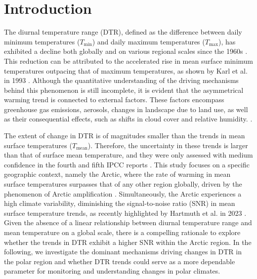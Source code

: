 

\chapter{Introduction}
\label{chap:einleitung}
 

The diurnal temperature range (DTR), defined as the difference between daily minimum temperatures ($T_{\mathrm{min}}$) and daily maximum temperatures ($T_{\mathrm{max}}$), has exhibited a decline both globally and on various regional scales since the 1960s \cite{Easterling.1997, Karl.1993, Alexander.2006}. This reduction can be attributed to the accelerated rise in mean surface minimum temperatures outpacing that of maximum temperatures, as shown by Karl et al. in 1993 \cite{Karl.1993}. Although the quantitative understanding of the driving mechanisms behind this phenomenon is still incomplete, it is evident that the asymmetrical warming trend is connected to external factors. These factors encompass greenhouse gas emissions, aerosols, changes in landscape due to land use, as well as their consequential effects, such as shifts in cloud cover and relative humidity. \cite{Zhou.2010, Lewis.2013, Liu.2016, Christidis.2016}.

The extent of change in DTR is of magnitudes smaller than the trends in mean surface temperatures ($T_{\mathrm{mean}}$). Therefore, the uncertainty in these trends is larger than that of surface mean temperature, and they were only assessed with medium confidence in the fourth and fifth IPCC reports \cite{.2014}.
This study focuses on a specific geographic context, namely the Arctic, where the rate of warming in mean surface temperatures surpasses that of any other region globally, driven by the phenomenon of Arctic amplification \cite{Pithan.2014}. Simultaneously, the Arctic experiences a high climate variability, diminishing the signal-to-noise ratio (SNR) in mean surface temperature trends, as recently highlighted by Hartmuth et al. in 2023 \cite{Hartmuth.2023}. Given the absence of a linear relationship between diurnal temperature range and mean temperature on a global scale, there is a compelling rationale to explore whether the trends in DTR exhibit a higher SNR within the Arctic region. In the following, we investigate the dominant mechanisms driving changes in DTR in the polar region and whether DTR trends could serve as a more dependable parameter for monitoring and understanding changes in polar climates.

